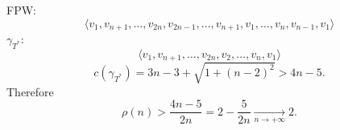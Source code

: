 FPW:
\[\langle v_1,v_{n+1},\ldots,v_{2n},v_{2n-1},\ldots,v_{n+1},v_1,\ldots,v_n,v_{n-1},v_1\rangle\]
$\gamma_{T^*}$:
\[\langle v_1,v_{n+1},\ldots,v_{2n},v_2,\ldots,v_n,v_1\rangle\]
\[c(\gamma_{T^*})=3n-3+\sqrt{1+(n-2)^2}>4n-5.\]
Therefore
\[\rho(n)>\frac{4n-5}{2n}=2-\frac5{2n}\xrightarrow[n\to+\infty]{}2.\]
